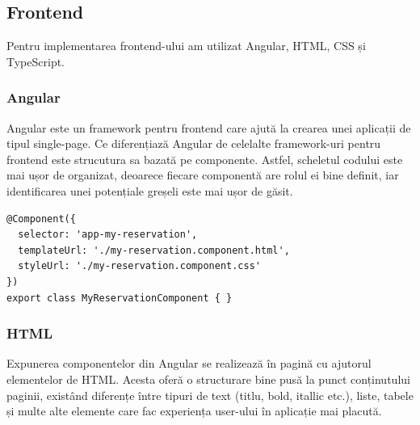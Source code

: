 \vspace{1.5em}
\subsection{Frontend}
Pentru implementarea frontend-ului am utilizat Angular, HTML, CSS și TypeScript.

\begin{minipage}{\textwidth}
\hfill
\begin{minipage}{0.9\textwidth}
\subsubsection{Angular}
\end{minipage}
\end{minipage}

\hspace{0cm} Angular este un framework pentru frontend care ajută la crearea unei aplicații de tipul single-page. Ce diferențiază Angular de celelalte framework-uri pentru frontend este strucutura sa bazată pe componente. Astfel, scheletul codului este mai ușor de organizat, deoarece fiecare componentă are rolul ei bine definit, iar identificarea unei potențiale greșeli este mai ușor de găsit.\cite{citation5}

\newpage

\begin{center}
\begin{minipage}{0.8\textwidth}
\captionsetup{type=listing}
   \begin{lstlisting}
@Component({
  selector: 'app-my-reservation',
  templateUrl: './my-reservation.component.html',
  styleUrl: './my-reservation.component.css'
})
export class MyReservationComponent { }
\end{lstlisting} 
\end{minipage}
\end{center}


\vspace{0.5em}


\begin{minipage}{\textwidth}
\hfill
\begin{minipage}{0.9\textwidth}
\subsubsection{HTML}
\end{minipage}
\end{minipage}

\hspace{0cm} Expunerea componentelor din Angular se realizează în pagină cu ajutorul elementelor de HTML. Acesta oferă o structurare bine pusă la punct conținutului paginii, existând diferențe între tipuri de text (titlu, bold, itallic etc.), liste, tabele și multe alte elemente care fac experiența user-ului în aplicație mai placută. 

